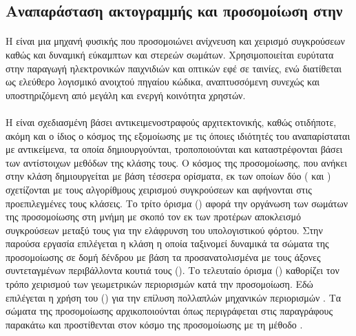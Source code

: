 \subsection{\texorpdfstring{Αναπαράσταση ακτογραμμής και προσομοίωση στην }{}}
\label{ssec:bullet}
\paragraph{} Η  είναι μια μηχανή φυσικής που προσομοιώνει ανίχνευση και
χειρισμό συγκρούσεων καθώς και δυναμική εύκαμπτων και στερεών σωμάτων. Χρησιμοποιείται
ευρύτατα στην παραγωγή ηλεκτρονικών παιχνιδιών και οπτικών εφέ σε ταινίες, ενώ διατίθεται
ως ελεύθερο λογισμικό ανοιχτού πηγαίου κώδικα, αναπτυσσόμενη συνεχώς και υποστηριζόμενη
από μεγάλη και ενεργή κοινότητα χρηστών.

\paragraph{} Η  είναι σχεδιασμένη βάσει αντικειμενοστραφούς αρχιτεκτονικής,
καθώς οτιδήποτε, ακόμη και ο ίδιος ο κόσμος της εξομοίωσης με τις όποιες ιδιότητές του
αναπαρίσταται με αντικείμενα, τα οποία δημιουργούνται, τροποποιούνται και καταστρέφονται
βάσει των αντίστοιχων μεθόδων της κλάσης τους. Ο κόσμος της προσομοίωσης, που ανήκει στην
κλάση  δημιουργείται με βάση τέσσερα ορίσματα, εκ των οποίων
δύο ( και ) σχετίζονται με τους
αλγορίθμους χειρισμού συγκρούσεων και αφήνονται στις προεπιλεγμένες τους κλάσεις. Το τρίτο
όρισμα () αφορά την οργάνωση των σωμάτων της προσομοίωσης στη
μνήμη με σκοπό τον εκ των προτέρων αποκλεισμό συγκρούσεων μεταξύ τους για την ελάφρυνση
του υπολογιστικού φόρτου. Στην παρούσα εργασία επιλέγεται η κλάση  η
οποία ταξινομεί δυναμικά τα σώματα της προσομοίωσης σε δομή δένδρου με βάση τα
προσανατολισμένα με τους άξονες συντεταγμένων περιβάλλοντα κουτιά τους (). Το
τελευταίο όρισμα () καθορίζει τον τρόπο χειρισμού των γεωμετρικών
περιορισμών κατά την προσομοίωση. Εδώ επιλέγεται η χρήση του  () για την επίλυση πολλαπλών μηχανικών περιορισμών
\cite{catto2005iterative}. Τα σώματα της προσομοίωσης αρχικοποιούνται όπως περιγράφεται
στις παραγράφους παρακάτω και προστίθενται στον κόσμο της προσομοίωσης με τη μέθοδο
.

